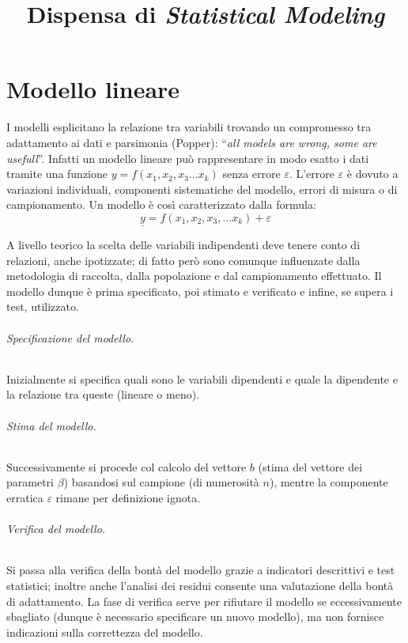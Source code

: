 \documentclass[11pt]{article}
\title{\textbf{Dispensa di \textit{Statistical Modeling}}}
\author{}
\date{}
\begin{document}
\maketitle
\tableofcontents

\newpage
\part{Modello lineare}
I modelli esplicitano la relazione tra variabili trovando un compromesso tra adattamento ai dati e parsimonia (Popper): ``\textit{all models are wrong, some are usefull}''.
Infatti un modello lineare può rappresentare in modo esatto i dati tramite una funzione $y = f(x_1, x_2, x_3\ldots x_k)$ senza errore $\varepsilon$.
L'errore $\varepsilon$ è dovuto a variazioni individuali, componenti sistematiche del modello, errori di misura o di campionamento.
Un modello è così caratterizzato dalla formula:
\begin{equation*}
  \underline{y} = f(x_1, x_2, x_3, \ldots x_k) + \varepsilon
\end{equation*}

A livello teorico la scelta delle variabili indipendenti deve tenere conto di relazioni, anche ipotizzate; di fatto però sono comunque influenzate dalla metodologia di raccolta, dalla popolazione e dal campionamento effettuato.
Il modello dunque è prima specificato, poi stimato e verificato e infine, se supera i test, utilizzato.

\paragraph{Specificazione del modello.}
Inizialmente si specifica quali sono le variabili dipendenti e quale la dipendente e la relazione tra queste (lineare o meno).

\paragraph{Stima del modello.}
Successivamente si procede col calcolo del vettore $b$ (stima del vettore dei parametri $\beta$) basandosi sul campione (di numerosità $n$), mentre la componente erratica $\varepsilon$ rimane per definizione ignota.

\paragraph{Verifica del modello.}
Si passa alla verifica della bontà del modello grazie a indicatori descrittivi e test statistici; inoltre anche l'analisi dei residui consente una valutazione della bontà di adattamento.
La fase di verifica serve per rifiutare il modello se eccessivamente sbagliato (dunque è necessario specificare un nuovo modello), ma non fornisce indicazioni sulla correttezza del modello. \newline
\end{document}
